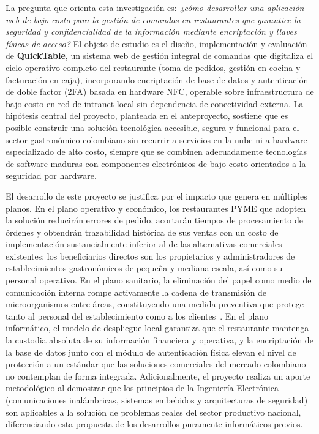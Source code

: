 La pregunta que orienta esta investigación es: \textit{¿cómo desarrollar una aplicación 
	web de bajo costo para la gestión de comandas en restaurantes que garantice la seguridad 
	y confidencialidad de la información mediante encriptación y llaves físicas de acceso?} 
El objeto de estudio es el diseño, implementación y evaluación de \textbf{QuickTable}, 
un sistema web de gestión integral de comandas que digitaliza el ciclo operativo completo 
del restaurante (toma de pedidos, gestión en cocina y facturación en caja), incorporando 
encriptación de base de datos y autenticación de doble factor (2FA) basada en hardware 
NFC, operable sobre infraestructura de bajo costo en red de intranet local sin dependencia 
de conectividad externa. La hipótesis central del proyecto, planteada en el anteproyecto, 
sostiene que es posible construir una solución tecnológica accesible, segura y funcional 
para el sector gastronómico colombiano sin recurrir a servicios en la nube ni a hardware 
especializado de alto costo, siempre que se combinen adecuadamente tecnologías de software 
maduras con componentes electrónicos de bajo costo orientados a la seguridad por hardware.

El desarrollo de este proyecto se justifica por el impacto que genera en múltiples planos. 
En el plano operativo y económico, los restaurantes PYME que adopten la solución reducirán 
errores de pedido, acortarán tiempos de procesamiento de órdenes y obtendrán trazabilidad 
histórica de sus ventas con un costo de implementación sustancialmente inferior al de las 
alternativas comerciales existentes; los beneficiarios directos son los propietarios y 
administradores de establecimientos gastronómicos de pequeña y mediana escala, así como su 
personal operativo. En el plano sanitario, la eliminación del papel como medio de 
comunicación interna rompe activamente la cadena de transmisión de microorganismos entre 
áreas, constituyendo una medida preventiva que protege tanto al personal del 
establecimiento como a los clientes~\cite{minsalud_resolucion2674_2013}. En el plano 
informático, el modelo de despliegue local garantiza que el restaurante mantenga la 
custodia absoluta de su información financiera y operativa, y la encriptación de la base de 
datos junto con el módulo de autenticación física elevan el nivel de protección a un 
estándar que las soluciones comerciales del mercado colombiano no contemplan de forma 
integrada. Adicionalmente, el proyecto realiza un aporte metodológico al demostrar que los 
principios de la Ingeniería Electrónica (comunicaciones inalámbricas, sistemas embebidos y 
arquitecturas de seguridad) son aplicables a la solución de problemas reales del sector 
productivo nacional, diferenciando esta propuesta de los desarrollos puramente 
informáticos previos.

